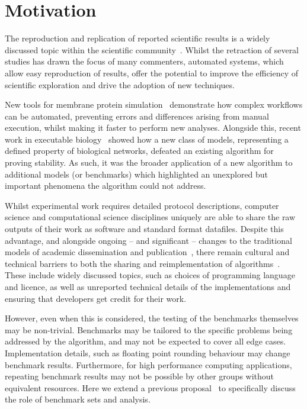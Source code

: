 \documentclass[conference]{IEEEtran}
\begin{document}

\section{Motivation}
The reproduction and replication of reported scientific results is a
widely discussed topic within the scientific community~\cite{barnes:2010,morin-et-al:2012,joppa-et-al:2013}. 
Whilst the retraction of several studies has drawn the focus of many
commenters, automated systems, which allow easy reproduction of results, offer the 
potential to improve the efficiency of scientific exploration and drive the
adoption of new techniques. 

New tools for membrane protein simulation~\cite{Stansfeld,hall2014} demonstrate
how complex workflows can be automated, preventing errors and differences 
arising from manual execution, whilst making it faster to perform new 
analyses. 
Alongside this, recent work in executable biology~\cite{Cook} showed how
a new class of models, representing a defined property of biological networks,
defeated an existing algorithm for proving stability. As such, it was the 
broader application of a new algorithm to additional models (or benchmarks)
which highlighted an unexplored but important phenomena the algorithm could 
not address.

Whilst experimental work requires detailed protocol descriptions, computer
science and computational science disciplines uniquely are
able to share the raw outputs of their work as software and standard format datafiles. Despite
this advantage, and alongside ongoing -- and significant -- changes to the
traditional models of academic dissemination and
publication~\cite{deroure:2010,stodden-et-al:2013,fursin+dubach:2014},
there remain cultural and technical barriers to both the
sharing and reimplementation of
algorithms~\cite{crick-et-al_wssspe2}. These include widely discussed
topics, such as choices of programming language and licence, as well
as unreported technical details of the implementations and ensuring
that developers get credit for their work.


However, even when this is considered, the testing of the benchmarks
themselves may be non-trivial. Benchmarks may be tailored to the 
specific problems being addressed by the algorithm, and may not be 
expected to cover all edge cases. Implementation details, such as 
floating point rounding behaviour may change benchmark results.
Furthermore, for high performance computing applications, repeating
benchmark results may not be possible by other groups without equivalent
resources. Here we extend a previous proposal~\cite{crick-et-al_wssspe2}
to specifically discuss the role of benchmark sets and analysis.
\end{document}
